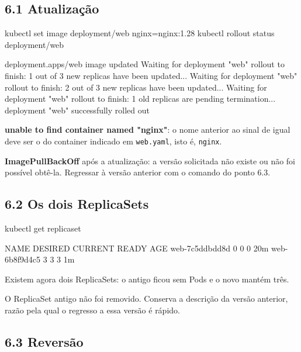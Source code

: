 \documentclass[11pt,a4paper]{article}
\newcommand{\cmd}[1]{\texttt{#1}}
\begin{document}
\subsection*{6.1 Atualização}

\begin{terminal}
kubectl set image deployment/web nginx=nginx:1.28
kubectl rollout status deployment/web
\end{terminal}

\begin{saida}
deployment.apps/web image updated
Waiting for deployment "web" rollout to finish: 1 out of 3 new replicas have been updated...
Waiting for deployment "web" rollout to finish: 2 out of 3 new replicas have been updated...
Waiting for deployment "web" rollout to finish: 1 old replicas are pending termination...
deployment "web" successfully rolled out
\end{saida}

\begin{erro}
\textbf{unable to find container named "nginx"}: o nome anterior ao sinal de igual deve ser o do container indicado em \cmd{web.yaml}, isto é, \cmd{nginx}.

\textbf{ImagePullBackOff} após a atualização: a versão solicitada não existe ou não foi possível obtê-la. Regressar à versão anterior com o comando do ponto 6.3.
\end{erro}

\subsection*{6.2 Os dois ReplicaSets}

\begin{terminal}
kubectl get replicaset
\end{terminal}

\begin{saida}
NAME             DESIRED   CURRENT   READY   AGE
web-7c5ddbdd8d   0         0         0       20m
web-6b8f9d4c5    3         3         3       1m
\end{saida}

\begin{observe}
Existem agora dois ReplicaSets: o antigo ficou sem Pods e o novo mantém três.

O ReplicaSet antigo não foi removido. Conserva a descrição da versão anterior, razão pela qual o regresso a essa versão é rápido.
\end{observe}

\subsection*{6.3 Reversão}
\end{document}
